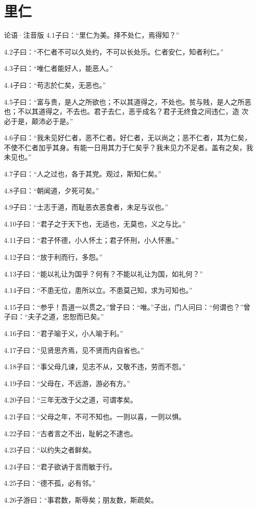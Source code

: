 \documentclass[a4paper,12pt,UTF8,twoside]{ctexbook}
\begin{document}
\chapter{里仁}
论语·注音版
4.1子曰：“里仁为美。择不处仁，焉得知？”

4.2子曰：“不仁者不可以久处约，不可以长处乐。仁者安仁，知者利仁。”

4.3子曰：“唯仁者能好人，能恶人。”

4.4子曰：“苟志於仁矣，无恶也。”

4.5子曰：“富与贵，是人之所欲也；不以其道得之，不处也。贫与贱，是人之所恶也；不以其道得之，不去也。君子去仁，恶乎成名？君子无终食之间违仁，造
次必于是，颠沛必于是。”

4.6子曰：“我未见好仁者，恶不仁者。好仁者，无以尚之；恶不仁者，其为仁矣，不使不仁者加乎其身。有能一日用其力于仁矣乎？我未见力不足者。盖有之矣，我未见也。”

4.7子曰：“人之过也，各于其党。观过，斯知仁矣。”

4.8子曰：“朝闻道，夕死可矣。”

4.9子曰：“士志于道，而耻恶衣恶食者，未足与议也。”

4.10子曰：“君子之于天下也，无适也，无莫也，义之与比。”

4.11子曰：“君子怀德，小人怀土；君子怀刑，小人怀惠。”

4.12子曰：“放于利而行，多怨。”

4.13子曰：“能以礼让为国乎？何有？不能以礼让为国，如礼何？”

4.14子曰：“不患无位，患所以立。不患莫己知，求为可知也。”

4.15子曰：“参乎！吾道一以贯之。”曾子曰：“唯。”子出，门人问曰：“何谓也？”曾子曰：“夫子之道，忠恕而已矣。”

4.16子曰：“君子喻于义，小人喻于利。”

4.17子曰：“见贤思齐焉，见不贤而内自省也。”

4.18子曰：“事父母几谏，见志不从，又敬不违，劳而不怨。”

4.19子曰：“父母在，不远游，游必有方。”

4.20子曰：“三年无改于父之道，可谓孝矣。

4.21子曰：“父母之年，不可不知也。一则以喜，一则以惧。

4.22子曰：“古者言之不出，耻躬之不逮也。

4.23子曰：“以约失之者鲜矣。

4.24子曰：“君子欲讷于言而敏于行。

4.25子曰：“德不孤，必有邻。”

4.26子游曰：“事君数，斯辱矣；朋友数，斯疏矣。
\end{document}
